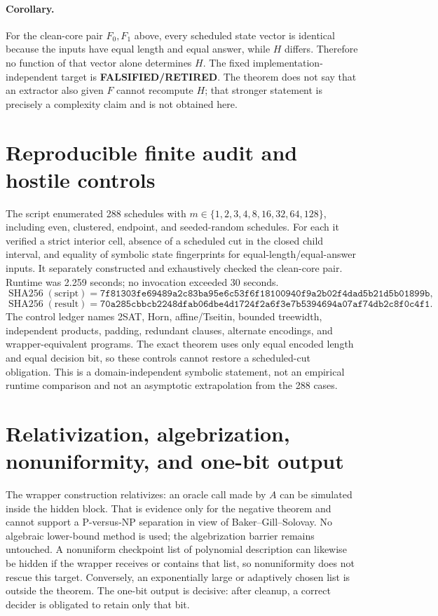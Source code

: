 \documentclass[11pt]{article}
\newcommand{\FALSIFIED}{\textbf{FALSIFIED/RETIRED}}
\begin{document}
\paragraph{Corollary.}
For the clean-core pair $F_0,F_1$ above, every scheduled state vector is identical because
the inputs have equal length and equal answer, while $H$ differs.  Therefore no function
of that vector alone determines $H$.  The fixed implementation-independent target is
\FALSIFIED.  The theorem does not say that an extractor also given $F$ cannot recompute
$H$; that stronger statement is precisely a complexity claim and is not obtained here.

\section{Reproducible finite audit and hostile controls}

The script
 enumerated 288
schedules with $m\in\{1,2,3,4,8,16,32,64,128\}$, including even, clustered, endpoint,
and seeded-random schedules.  For each it verified a strict interior cell, absence of a
scheduled cut in the closed child interval, and equality of symbolic state fingerprints
for equal-length/equal-answer inputs.  It separately constructed and exhaustively checked
the clean-core pair.  Runtime was 2.259 seconds; no invocation exceeded 30 seconds.
\[
 \operatorname{SHA256}(\text{script})=
 \texttt{7f81303fe69489a2c83ba95e6c53f6f18100940f9a2b02f4dad5b21d5b01899b},
\]
\[
 \operatorname{SHA256}(\text{result})=
 \texttt{70a285cbbcb2248dfab06dbe4d1724f2a6f3e7b5394694a07af74db2c8f0c4f1}.
\]
The control ledger names 2SAT, Horn, affine/Tseitin, bounded treewidth, independent
products, padding, redundant clauses, alternate encodings, and wrapper-equivalent
programs.  The exact theorem uses only equal encoded length and equal decision bit, so
these controls cannot restore a scheduled-cut obligation.  This is a domain-independent
symbolic statement, not an empirical runtime comparison and not an asymptotic
extrapolation from the 288 cases.

\section{Relativization, algebrization, nonuniformity, and one-bit output}

The wrapper construction relativizes: an oracle call made by $A$ can be simulated inside
the hidden block.  That is evidence only for the negative theorem and cannot support a
P-versus-NP separation in view of Baker--Gill--Solovay.  No algebraic lower-bound method
is used; the algebrization barrier remains untouched.  A nonuniform checkpoint list of
polynomial description can likewise be hidden if the wrapper receives or contains that
list, so nonuniformity does not rescue this target.  Conversely, an exponentially large
or adaptively chosen list is outside the theorem.  The one-bit output is decisive: after
cleanup, a correct decider is obligated to retain only that bit.
\end{document}

